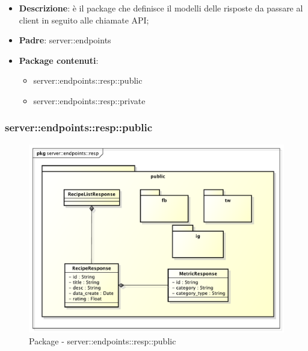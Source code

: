 \begin{itemize}
  \item \textbf{Descrizione}: è il package che definisce il modelli delle risposte da passare al client in seguito alle chiamate API;
  \item \textbf{Padre}: server::endpoints
  \item \textbf{Package contenuti}:
  	\begin{itemize}
  		\item server::endpoints::resp::public
  		\item server::endpoints::resp::private
	\end{itemize}
\end{itemize}

\subsubsection{server::endpoints::resp::public} %
\label{ssub:bdsm_app_server_endpoints_resp_public}
\begin{figure}[!htbp]
	\centering
	\centerline{\includegraphics[scale=0.55]{./images/server/resp_public.pdf}}
	\caption{Package - server::endpoints::resp::public}
\end{figure}

